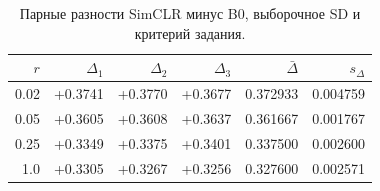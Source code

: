 \begin{table}[H]\centering\small
\setlength{\tabcolsep}{4pt}
\caption{Парные разности SimCLR минус B0, выборочное SD и критерий задания.}\label{tab:gains}
\begin{tabular}{rrrrrr}
\toprule
$r$ & $\Delta_1$ & $\Delta_2$ & $\Delta_3$ & $\bar\Delta$ & $s_\Delta$ \\
\midrule
0.02 & +0.3741 & +0.3770 & +0.3677 & 0.372933 & 0.004759 \\
0.05 & +0.3605 & +0.3608 & +0.3637 & 0.361667 & 0.001767 \\
0.25 & +0.3349 & +0.3375 & +0.3401 & 0.337500 & 0.002600 \\
1.0 & +0.3305 & +0.3267 & +0.3256 & 0.327600 & 0.002571 \\
\bottomrule
\end{tabular}
\end{table}
